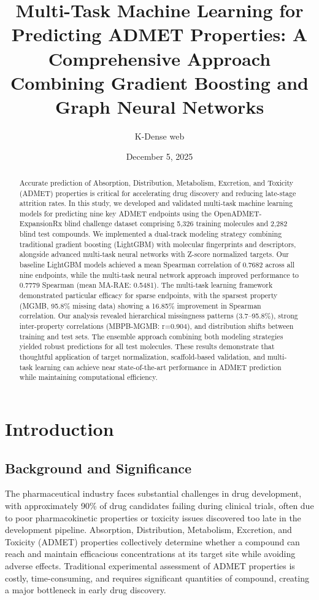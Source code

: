 \documentclass[11pt,a4paper]{article}
\title{\textbf{Multi-Task Machine Learning for Predicting ADMET Properties: A Comprehensive Approach Combining Gradient Boosting and Graph Neural Networks}}
\author{K-Dense web}
\date{December 5, 2025}
\begin{document}
\maketitle

\begin{abstract}
Accurate prediction of Absorption, Distribution, Metabolism, Excretion, and Toxicity (ADMET) properties is critical for accelerating drug discovery and reducing late-stage attrition rates. In this study, we developed and validated multi-task machine learning models for predicting nine key ADMET endpoints using the OpenADMET-ExpansionRx blind challenge dataset comprising 5,326 training molecules and 2,282 blind test compounds. We implemented a dual-track modeling strategy combining traditional gradient boosting (LightGBM) with molecular fingerprints and descriptors, alongside advanced multi-task neural networks with Z-score normalized targets. Our baseline LightGBM models achieved a mean Spearman correlation of 0.7682 across all nine endpoints, while the multi-task neural network approach improved performance to 0.7779 Spearman (mean MA-RAE: 0.5481). The multi-task learning framework demonstrated particular efficacy for sparse endpoints, with the sparsest property (MGMB, 95.8\% missing data) showing a 16.85\% improvement in Spearman correlation. Our analysis revealed hierarchical missingness patterns (3.7--95.8\%), strong inter-property correlations (MBPB-MGMB: r=0.904), and distribution shifts between training and test sets. The ensemble approach combining both modeling strategies yielded robust predictions for all test molecules. These results demonstrate that thoughtful application of target normalization, scaffold-based validation, and multi-task learning can achieve near state-of-the-art performance in ADMET prediction while maintaining computational efficiency.
\end{abstract}

\section{Introduction}

\subsection{Background and Significance}

The pharmaceutical industry faces substantial challenges in drug development, with approximately 90\% of drug candidates failing during clinical trials, often due to poor pharmacokinetic properties or toxicity issues discovered too late in the development pipeline\cite{Macdern2025ASAP}. Absorption, Distribution, Metabolism, Excretion, and Toxicity (ADMET) properties collectively determine whether a compound can reach and maintain efficacious concentrations at its target site while avoiding adverse effects\cite{expansion_context}. Traditional experimental assessment of ADMET properties is costly, time-consuming, and requires significant quantities of compound, creating a major bottleneck in early drug discovery.
\end{document}
